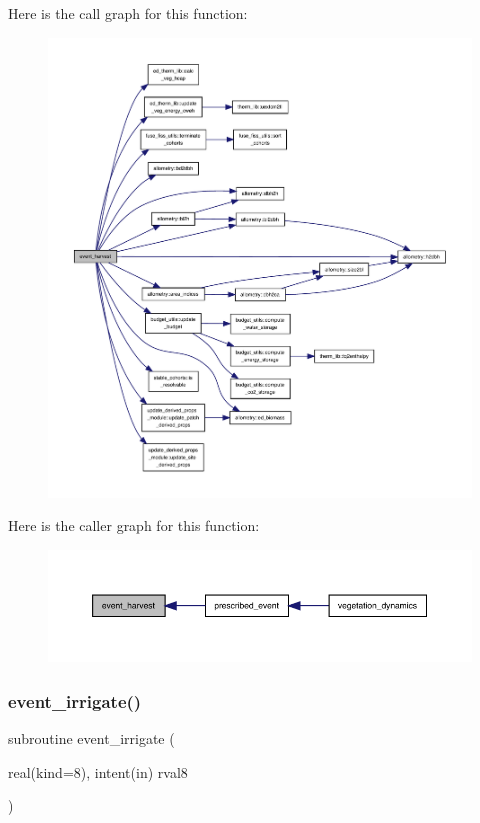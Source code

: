 Here is the call graph for this function\+:
\nopagebreak
\begin{figure}[H]
\begin{center}
\leavevmode
\includegraphics[width=350pt]{events_8f90_ad9cbf1522be96cc9af2fbf80b1402d5c_cgraph}
\end{center}
\end{figure}
Here is the caller graph for this function\+:
\nopagebreak
\begin{figure}[H]
\begin{center}
\leavevmode
\includegraphics[width=350pt]{events_8f90_ad9cbf1522be96cc9af2fbf80b1402d5c_icgraph}
\end{center}
\end{figure}
\mbox{\label{events_8f90_a197a13ef9490ada81059c66e30c88b66}} 
\subsubsection{\texorpdfstring{event\+\_\+irrigate()}{event\_irrigate()}}
{\footnotesize\ttfamily subroutine event\+\_\+irrigate (\begin{DoxyParamCaption}\item[{real(kind=8), intent(in)}]{rval8 }\end{DoxyParamCaption})}

